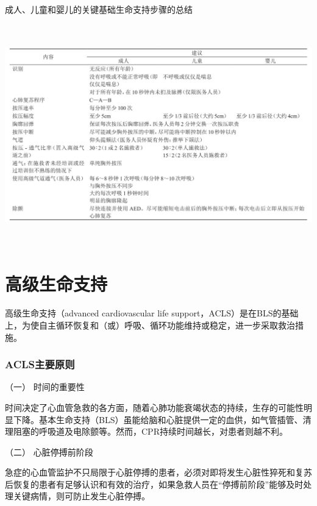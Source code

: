 \begin{table}[htbp]
\centering
\caption{成人、儿童和婴儿的关键基础生命支持步骤的总结}
\label{tab101-2}
\includegraphics[width=6.66667in,height=3.78125in]{./images/Image00411.jpg}
\end{table}

\protect\hypertarget{text00284.html}{}{}

\section{高级生命支持}

高级生命支持（advanced cardiovascular life
support，ACLS）是在BLS的基础上，为使自主循环恢复和（或）呼吸、循环功能维持或稳定，进一步采取救治措施。

\subsubsection{ACLS主要原则}

\hypertarget{text00284.htmlux5cux23CHP10-1-5-1-1}{}
（一） 时间的重要性

时间决定了心血管急救的各方面，随着心肺功能衰竭状态的持续，生存的可能性明显下降。基本生命支持（BLS）虽能给脑和心脏提供一定的血供，如气管插管、清理阻塞的呼吸道及电除颤等。然而，CPR持续时间越长，对患者则越不利。

\hypertarget{text00284.htmlux5cux23CHP10-1-5-1-2}{}
（二） 心脏停搏前阶段

急症的心血管监护不只局限于心脏停搏的患者，必须对即将发生心脏性猝死和复苏后恢复的患者有足够认识和有效的治疗，如果急救人员在“停搏前阶段”能够及时处理关键病情，则可防止发生心脏停搏。

